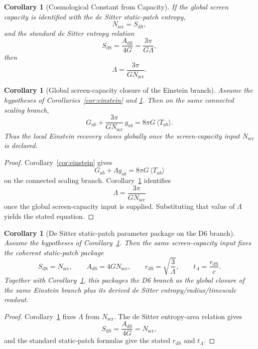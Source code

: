 \documentclass[11pt]{article}
\newtheorem{corollary}[theorem]{Corollary}
\begin{document}
\begin{corollary}[Cosmological Constant from Capacity]\label{cor:lambda}
If the global screen capacity is identified with the de Sitter static-patch entropy,
\[
N_{\mathrm{scr}}=S_{\mathrm{dS}},
\]
\noindent and the standard de Sitter entropy relation
\[
S_{\mathrm{dS}}=\frac{A_{\mathrm{dS}}}{4G}=\frac{3\pi}{G\Lambda},
\]
then
\[
\Lambda=\frac{3\pi}{G N_{\mathrm{scr}}}.
\]
\end{corollary}

\begin{corollary}[Global screen-capacity closure of the Einstein branch]\label{cor:lambda-global}
Assume the hypotheses of Corollaries~\ref{cor:einstein} and \ref{cor:lambda}. Then on the same connected scaling branch,
\[
G_{ab}+\frac{3\pi}{G N_{\mathrm{scr}}}\,g_{ab}=8\pi G\,\langle T_{ab}\rangle.
\]
Thus the local Einstein recovery closes globally once the screen-capacity input \(N_{\mathrm{scr}}\) is declared.
\end{corollary}

\begin{proof}
Corollary~\ref{cor:einstein} gives
\[
G_{ab}+\Lambda g_{ab}=8\pi G\,\langle T_{ab}\rangle
\]
on the connected scaling branch. Corollary~\ref{cor:lambda} identifies
\[
\Lambda=\frac{3\pi}{G N_{\mathrm{scr}}}
\]
once the global screen-capacity input is supplied. Substituting that value of \(\Lambda\) yields the stated equation.
\end{proof}

\begin{corollary}[De Sitter static-patch parameter package on the D6 branch]\label{cor:lambda-parameters}
Assume the hypotheses of Corollary~\ref{cor:lambda}. Then the same screen-capacity input fixes the coherent static-patch package
\[
S_{\mathrm{dS}}=N_{\mathrm{scr}},
\qquad
A_{\mathrm{dS}}=4G N_{\mathrm{scr}},
\qquad
r_{\mathrm{dS}}=\sqrt{\frac{3}{\Lambda}},
\qquad
t_\Lambda=\frac{r_{\mathrm{dS}}}{c}.
\]
Together with Corollary~\ref{cor:lambda-global}, this packages the D6 branch as the global closure of the same Einstein branch plus its derived de Sitter entropy/radius/timescale readout.
\end{corollary}

\begin{proof}
Corollary~\ref{cor:lambda} fixes \(\Lambda\) from \(N_{\mathrm{scr}}\). The de Sitter entropy-area relation gives
\[
S_{\mathrm{dS}}=\frac{A_{\mathrm{dS}}}{4G}=N_{\mathrm{scr}},
\]
and the standard static-patch formulas give the stated \(r_{\mathrm{dS}}\) and \(t_\Lambda\).
\end{proof}
\end{document}

